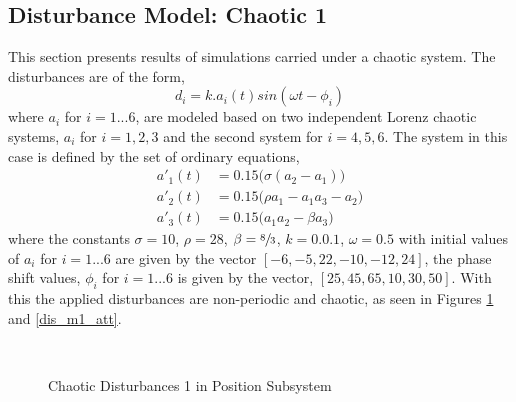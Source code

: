 \documentclass[letterpaper%
, twoside%
, 12pt%
,memoire%
, english%
,creativecommons,hyperref%
]{thETS}
\begin{document}
\subsection{Disturbance Model: Chaotic 1}
This section presents results of simulations carried under a chaotic system. The disturbances are of the form,
\begin{equation}
d_i = k.a_i(t)sin(\omega t-\phi_i)
\label{eq:dist_1}
\end{equation}
where $a_i$ for $i=1...6$, are modeled based on two independent Lorenz chaotic systems, $a_i$ for $i=1,2,3$ and the second system for $i=4,5,6$. The system in this case is defined by the set of ordinary equations, 
\begin{subequations}
\begin{align}
a'_1(t) &= 0.15\big(\sigma(a_2-a_1)\big)\\
a'_2(t) &= 0.15\big(\rho a_1 - a_1 a_3 - a_2\big)\\
a'_3(t) &= 0.15\big(a_1 a_2 - \beta a_3\big)
\end{align}
\end{subequations}
where the constants $\sigma=10$, $\rho=28$, $\beta=\sfrac{8}{3}$, $k=0.0.1$, $\omega=0.5$ with initial values of $a_i$ for $i=1...6$ are given by the vector $[-6,-5,22,-10,-12,24]$, the phase shift values, $\phi_i$ for $i=1...6$ is given by the vector, $[25,45,65,10,30,50]$. With this the applied disturbances are non-periodic and chaotic, as seen in Figures \ref{dis_m1_pos} and \ref{dis_m1_att}.

\begin{figure}[H]
\centering
{}
\\ \parbox{0.75\textwidth}{\caption{Chaotic Disturbances 1 in Position Subsystem}\label{dis_m1_pos}}
\end{figure}
\end{document}
